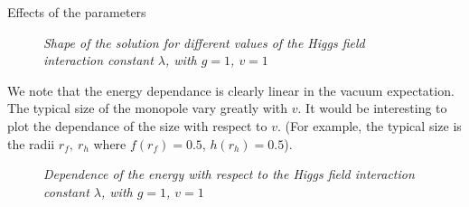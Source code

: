 \begin{subsection}{Effects of the parameters}
  \begin{figure}
    \begin{center}
      
      
      \caption{\em Shape of the solution for different values of the Higgs
        field interaction constant $\lambda$, with $g=1$, $v = 1$}
      \label{fig:varying_lambda_fh}
    \end{center}
  \end{figure}
  We note that the energy dependance is clearly linear in the vacuum
  expectation. The typical size of the monopole vary greatly with $v$. It would be interesting to plot the dependance of the size with respect to $v$. (For example, the typical size is the radii $r_f,\ r_h$ where $f(r_f) = 0.5$, $h(r_h) = 0.5$).
  \begin{figure}
    \begin{center}
      
      \caption{\em Dependence of the energy with respect to the Higgs
        field interaction constant $\lambda$, with $g=1$, $v = 1$}
      \label{fig:varying_lambda_energy}
    \end{center}
  \end{figure}

\end{subsection}
